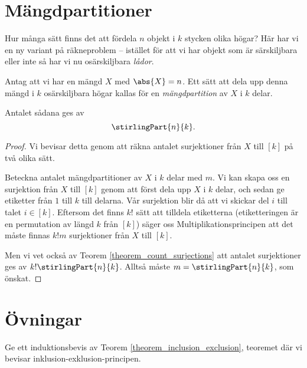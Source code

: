 \documentclass[nobib]{tufte-handout}
\begin{document}
\section{Mängdpartitioner}

Hur många sätt finns det att fördela $n$ objekt i $k$ stycken olika högar? Här har vi en ny variant på räkneproblem -- istället för att vi har objekt som är särskiljbara eller inte så har vi nu osärskiljbara \emph{lådor}.

\begin{theorem}
  Antag att vi har en mängd $X$ med $\abs{X} = n$. Ett sätt att dela upp denna mängd i $k$ osärskiljbara högar kallas för en \emph{mängdpartition} av $X$ i $k$ delar.

  Antalet sådana ges av
  $$\stirlingPart{n}{k}.$$

  \begin{proof}
    Vi bevisar detta genom att räkna antalet surjektioner från $X$ till $[k]$ på två olika sätt.

    Beteckna antalet mängdpartitioner av $X$ i $k$ delar med $m$. Vi kan skapa oss en surjektion från $X$ till $[k]$ genom att först dela upp $X$ i $k$ delar, och sedan ge etiketter från $1$ till $k$ till delarna. Vår surjektion blir då att vi skickar del $i$ till talet $i \in [k]$. Eftersom det finns $k!$ sätt att tilldela etiketterna (etiketteringen är en permutation av längd $k$ från $[k]$) säger oss Multiplikationsprincipen att det måste finnas $k!m$ surjektioner från $X$ till $[k]$.

    Men vi vet också av Teorem \ref{theorem_count_surjections} att antalet surjektioner ges av $k!\stirlingPart{n}{k}$. Alltså måste $m = \stirlingPart{n}{k}$, som önskat.
  \end{proof}
\end{theorem}

\section{Övningar}

\begin{xca}
  Ge ett induktionsbevis av Teorem \ref{theorem_inclusion_exclusion}, teoremet där vi bevisar inklusion-exklusion-principen.
\end{xca}
\end{document}
